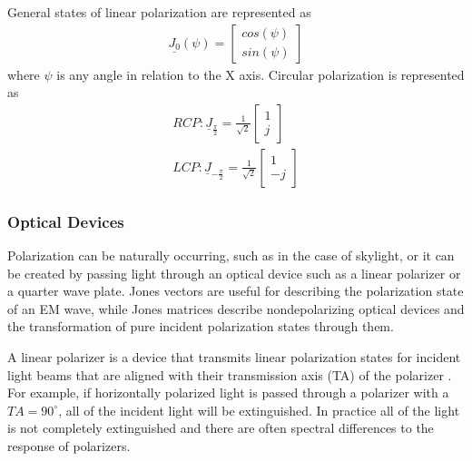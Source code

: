 %
General states of linear polarization are represented as
%
\begin{align}
    \underline{J_0}(\psi) =
    \begin{bmatrix}
        cos(\psi) \\
        sin(\psi)
    \end{bmatrix}
\end{align}
%
where $\psi$ is any angle in relation to the X axis.  Circular polarization is represented as
%
\begin{align}
    RCP: \underline{J}_{\frac{\pi}{2}} = \frac{1}{\sqrt{2}}
    \begin{bmatrix}
        1 \\
        j
    \end{bmatrix} \\
    LCP: \underline{J}_{-\frac{\pi}{2}} = \frac{1}{\sqrt{2}}
    \begin{bmatrix}
        1 \\
        -j
    \end{bmatrix}
\end{align}
%
\subsubsection{Optical Devices}
Polarization can be naturally occurring, such as in the case of skylight, or it can be created by passing light through an optical device such as a linear polarizer or a quarter wave plate.  Jones vectors are useful for describing the polarization state of an EM wave, while Jones matrices describe nondepolarizing optical devices and the transformation of pure incident polarization states through them.

A linear polarizer is a device that transmits linear polarization states for incident light beams that are aligned with their transmission axis (TA) of the polarizer \cite{polarizedlight}.  For example, if horizontally polarized light is passed through a polarizer with a $TA = 90^{\circ}$, all of the incident light will be extinguished.  In practice all of the light is not completely extinguished and there are often spectral differences to the response of polarizers.


